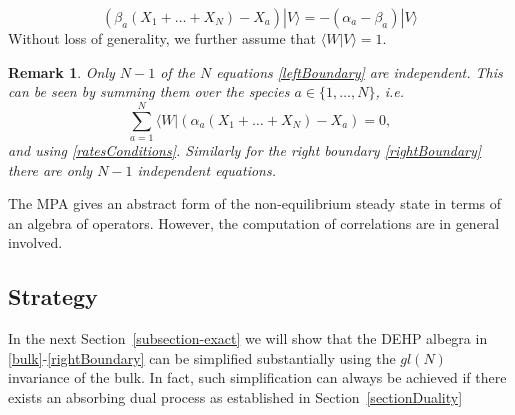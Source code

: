 \documentclass[10pt]{article}
\numberwithin{equation}{section}
\numberwithin{equation}{subsection}
\newtheorem{remark}{Remark}
\newcommand{\dt}{\;.}
\begin{document}
\begin{equation}\label{rightBoundary}
	\left(\beta_{a}(X_{1}+\ldots+X_{N})-X_{a}\right)|V\rangle=-(\alpha_{a}-\beta_{a})|V\rangle%
\end{equation}
Without loss of generality, we further assume that $\langle W|V\rangle=1$. 
\begin{remark} Only $N-1$ of the $N$ equations \eqref{leftBoundary}  are independent. This can be seen by summing them over the species $a\in \{1,\ldots,N\}$, i.e.
	\begin{equation}
		\sum_{a=1}^{N}	\langle W|\left(\alpha_{a}(X_{1}+\ldots+X_{N})-X_{a}\right)=0,%
	\end{equation}
	and using  \eqref{ratesConditions}.
 Similarly for the right boundary  \eqref{rightBoundary} there are only  $N-1$ independent equations. \end{remark} 
The MPA gives an abstract form of the non-equilibrium steady state in terms of an algebra of operators. However, the computation of  correlations are in general involved. 

\subsection{Strategy}
 In the next Section~\ref{subsection-exact} we will show that the DEHP albegra in \eqref{bulk}-\eqref{rightBoundary} can be simplified substantially using the ${gl}(N)$ invariance of the bulk. In fact, such simplification can always be achieved if 
  there exists an absorbing dual process as established in Section~\ref{sectionDuality}
 
\end{document}
